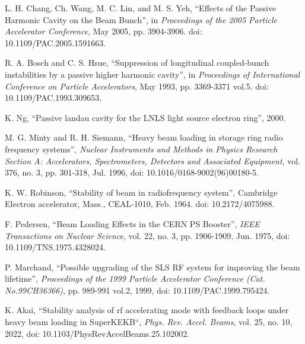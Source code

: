 \documentclass[letterpaper,
               nospread,     %
               ]{jacow}
\begin{document}
%
%
{\printbibliography}%
{%

   \begin{thebibliography}{99}   %

      L. H. Chang, Ch. Wang, M. C. Lin, and M. S. Yeh, “Effects of the Passive Harmonic Cavity on the Beam Bunch”, in
      \textit{Proceedings of the 2005 Particle Accelerator Conference},
      May 2005, pp. 3904-3906. doi: 10.1109/PAC.2005.1591663.

      R. A. Bosch and C. S. Hsue, “Suppression of longitudinal coupled-bunch instabilities by a passive higher harmonic cavity”, in
      \textit{Proceedings of International Conference on Particle Accelerators},
      May 1993, pp. 3369-3371 vol.5. doi: 10.1109/PAC.1993.309653.

      K. Ng, “Passive landau cavity for the LNLS light source electron ring”, 2000.

      M. G. Minty and R. H. Siemann, “Heavy beam loading in storage ring radio frequency systems”,
      \textit{Nuclear Instruments and Methods in Physics Research Section A: Accelerators, Spectrometers, Detectors and Associated Equipment},
      vol. 376, no. 3, pp. 301-318, Jul. 1996, doi: 10.1016/0168-9002(96)00180-5.

      K. W. Robinson, “Stability of beam in radiofrequency system”, Cambridge Electron accelerator, Mass., CEAL-1010, Feb. 1964. doi: 10.2172/4075988.

      F. Pedersen, “Beam Loading Effects in the CERN PS Booster”,
      \textit{IEEE Transactions on Nuclear Science},
      vol. 22, no. 3, pp. 1906-1909, Jun. 1975, doi: 10.1109/TNS.1975.4328024.

      P. Marchand, “Possible upgrading of the SLS RF system for improving the beam lifetime”,
      \textit{Proceedings of the 1999 Particle Accelerator Conference (Cat. No.99CH36366)},
      pp. 989-991 vol.2, 1999, doi: 10.1109/PAC.1999.795424.

      K. Akai, “Stability analysis of rf accelerating mode with feedback loops under heavy beam loading in SuperKEKB“,
      \textit{Phys. Rev. Accel. Beams},
      vol. 25, no. 10, 2022, doi: 10.1103/PhysRevAccelBeams.25.102002.


\end{thebibliography}}
\end{document}
